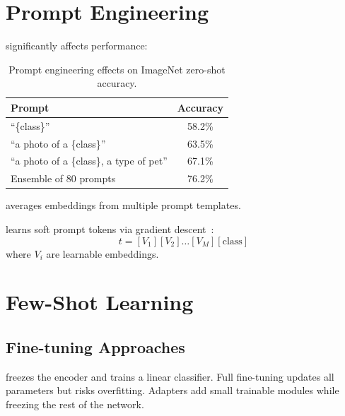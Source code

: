 \section{Prompt Engineering}


 significantly affects performance:

\begin{table}
\centering
\begin{tabular}{lc}
\toprule
\textbf{Prompt} & \textbf{Accuracy} \\
\midrule
``\{class\}'' & 58.2\% \\
``a photo of a \{class\}'' & 63.5\% \\
``a photo of a \{class\}, a type of pet'' & 67.1\% \\
Ensemble of 80 prompts & 76.2\% \\
\bottomrule
\end{tabular}
\caption{Prompt engineering effects on ImageNet zero-shot accuracy.}
\label{tab:prompt_engineering}
\end{table}

 averages embeddings from multiple prompt templates.

 learns soft prompt tokens via gradient descent~\cite{Zhou2022CoOp}:
\begin{equation}
    t = [V_1][V_2]\ldots[V_M][\text{class}]
\end{equation}
where $V_i$ are learnable embeddings.


\section{Few-Shot Learning}


\subsection{Fine-tuning Approaches}

 freezes the encoder and trains a linear classifier. Full fine-tuning updates all parameters but risks overfitting. Adapters add small trainable modules while freezing the rest of the network.

